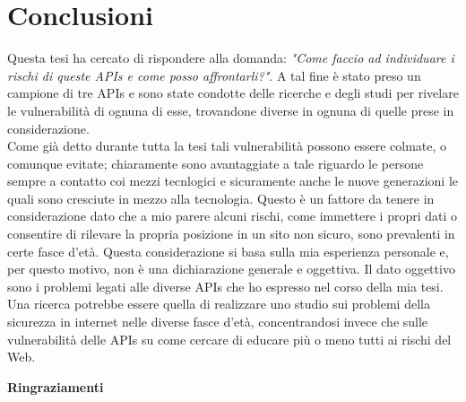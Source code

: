 \documentclass[11pt ,a4paper , twoside , openright ]{book}
\begin{document}
	
	\newpage
	\cleardoublepage
	\chapter{Conclusioni}
	Questa tesi ha cercato di rispondere alla domanda: \textit{"Come faccio ad individuare i rischi di queste APIs e come posso affrontarli?"}. A tal fine è stato preso un campione di tre APIs e sono state condotte delle ricerche e degli studi per rivelare le vulnerabilità di ognuna di esse, trovandone diverse in ognuna di quelle prese in considerazione. 
	\\
	Come già detto durante tutta la tesi tali vulnerabilità possono essere colmate, o comunque evitate; chiaramente sono avantaggiate a tale riguardo le persone sempre a contatto coi mezzi tecnlogici e sicuramente anche le nuove generazioni le quali sono cresciute in mezzo alla tecnologia. Questo è un fattore  da tenere in considerazione dato che a mio parere alcuni rischi, come immettere i propri dati o consentire di rilevare la propria posizione in un sito non sicuro, sono prevalenti in certe fasce d'età. Questa considerazione si basa sulla mia esperienza personale e, per questo motivo, non è una dichiarazione generale e oggettiva. Il dato oggettivo sono i problemi legati alle diverse APIs che ho espresso nel corso della mia tesi.
	\\
	Una ricerca potrebbe essere quella di realizzare uno studio sui problemi della sicurezza in internet nelle diverse fasce d'età, concentrandosi invece che sulle vulnerabilità delle APIs su come cercare di educare più o meno tutti ai rischi del Web.
	\cleardoublepage
	\begin{center}
		\textbf{Ringraziamenti}
	\end{center}
\end{document}
